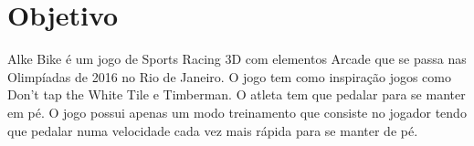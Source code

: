 \section{Objetivo}
Alke Bike é um jogo de Sports Racing 3D com elementos Arcade que se passa nas Olimpíadas de 2016 no Rio de Janeiro. O jogo tem como inspiração jogos como Don't tap the White Tile e Timberman. O atleta tem que pedalar para se manter em pé. O jogo possui apenas um modo treinamento que consiste no jogador tendo que pedalar numa velocidade cada vez mais rápida para se manter de pé.
